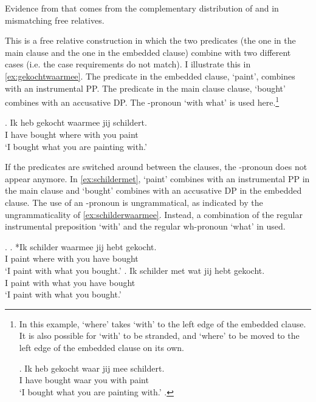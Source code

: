 \documentclass[12pt]{article}
\begin{document}
Evidence from that comes from the complementary distribution of  and  in mismatching free relatives.

This is a free relative construction in which the two predicates (the one in the main clause and the one in the embedded clause) combine with two different cases (i.e. the case requirements do not match). I illustrate this in \ref{ex:gekochtwaarmee}. The predicate in the embedded clause,  `paint', combines with an instrumental PP. The predicate in the main clause clause,  `bought' combines with an accusative DP. The -pronoun  `with what' is used here.\footnote{In this example,  `where' takes  `with' to the left edge of the embedded clause. It is also possible for  `with' to be stranded, and  `where' to be moved to the left edge of the embedded clause on its own.

\exg. Ik heb gekocht waar jij mee schildert.\\
 I have bought waar you with paint\\
 `I bought what you are painting with.'\label{ex:meealong}
\z.

\phantom{x}
}

\exg. Ik heb gekocht waarmee jij schildert.\\
 I have bought {where with} you paint\\
 `I bought what you are painting with.'\label{ex:gekochtwaarmee}

If the predicates are switched around between the clauses, the -pronoun does not appear anymore. In \ref{ex:schildermet},  `paint' combines with an instrumental PP in the main clause and  `bought' combines with an accusative DP in the embedded clause. The use of an -pronoun is ungrammatical, as indicated by the ungrammaticality of \ref{ex:schilderwaarmee}. Instead, a combination of the regular instrumental preposition  `with' and the regular wh-pronoun  `what' in used.

\ex.\label{ex:schildermet}
\ag. *Ik schilder waarmee jij hebt gekocht.\\
 I paint {where with} you have bought\\
 `I paint with what you bought.'\label{ex:schilderwaarmee}
\bg. Ik schilder met wat jij hebt gekocht.\\
 I paint with what you have bought\\
 `I paint with what you bought.'\label{ex:schildermetwat}
\end{document}
